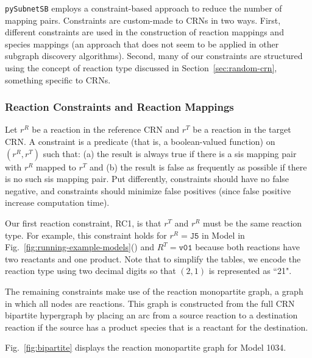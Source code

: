 \documentclass[webpdf,contemporary,large]{oup-authoring-template}
\newcommand{\revision}[1]{\color{red}{#1 }\color{black}}
\newcommand{\revisionb}[1]{\color{red}{#1}\color{black}}
\newcommand{\fig}[1]{
  Fig.~\ref{#1}}
\newcommand{\secref}[1]{Section~\ref{#1}}
\newcommand{\py}{\texttt{pySubnetSB}}
\theoremstyle{thmstyleone}%
\theoremstyle{thmstyletwo}%
\theoremstyle{thmstylethree}%
\begin{document}
\py{} employs a constraint-based approach to reduce the number of mapping pairs.
Constraints are custom-made to CRNs in two ways.
First, different constraints are used in the construction of reaction mappings and species mappings
(an approach that does not seem to be applied in other subgraph discovery algorithms).
Second, many of our constraints are structured using the concept of reaction type discussed in \secref{sec:random-crn}, something specific to CRNs.


\subsubsection{Reaction Constraints and Reaction Mappings}
Let $r^R$ be a reaction in the reference CRN and
$r^T$ be a reaction in the target CRN.
A constraint is a predicate (that is, a boolean-valued function) on $(r^R, r^T)$ such that: (a)
the result is always true if there is a sis mapping pair
with $r^R$ mapped to $r^T$
and (b) the result is false as frequently as possible
if there is no such sis mapping pair.
Put differently, constraints should have no false negative, and
constraints should minimize false positives (since false positive increase computation time).

Our first reaction constraint, RC1, is that $r^T$ and $r^R$ must be the same reaction type.
For example, this constraint holds for $r^{R} = \texttt{J5}$ in Model \revision{1034}  in \fig{fig:running-example-models}(\revisionb{b}) and
$R^T = \texttt{v01}$ because both reactions have
two reactants and one product.
Note that to simplify the tables, we encode the reaction type using
two decimal digits so that $(2, 1)$ is represented as ``21".

The remaining constraints make use of the reaction monopartite graph, a graph in which all nodes are reactions.
This graph is constructed
from the full CRN bipartite hypergraph
by placing an arc from a source reaction to a destination reaction if the source has a product species that is a reactant for the destination.
\fig{fig:bipartite} displays the reaction monopartite graph for Model 1034.
\end{document}
